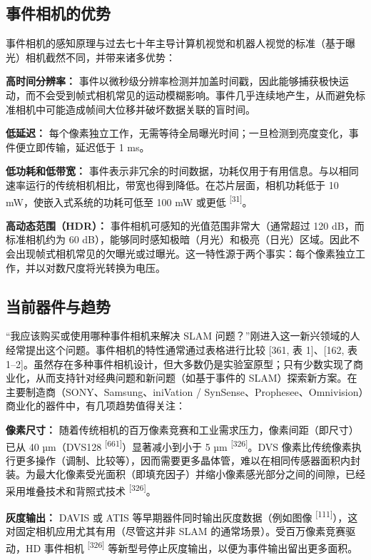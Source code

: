 \subsection{事件相机的优势}

事件相机的感知原理与过去七十年主导计算机视觉和机器人视觉的标准（基于曝光）相机截然不同，并带来诸多优势：

\textbf{高时间分辨率：} 事件以微秒级分辨率检测并加盖时间戳，因此能够捕获极快运动，而不会受到帧式相机常见的运动模糊影响。事件几乎连续地产生，从而避免标准相机中可能造成帧间大位移并破坏数据关联的盲时间。

\textbf{低延迟：} 每个像素独立工作，无需等待全局曝光时间；一旦检测到亮度变化，事件便立即传输，延迟低于 1 ms。

\textbf{低功耗和低带宽：} 事件表示非冗余的时间数据，功耗仅用于有用信息。与以相同速率运行的传统相机相比，带宽也得到降低。在芯片层面，相机功耗低于 10 mW，使嵌入式系统的功耗可低至 100 mW 或更低 \textsuperscript{[31]}。

\textbf{高动态范围（HDR）：} 事件相机可感知的光值范围非常大（通常超过 120 dB，而标准相机约为 60 dB），能够同时感知极暗（月光）和极亮（日光）区域。因此不会出现帧式相机常见的欠曝光或过曝光。这一特性源于两个事实：每个像素独立工作，并以对数尺度将光转换为电压。

\subsection{当前器件与趋势}

“我应该购买或使用哪种事件相机来解决 SLAM 问题？”刚进入这一新兴领域的人经常提出这个问题。事件相机的特性通常通过表格进行比较 [361, 表 1]、[162, 表 1–2]。虽然存在多种事件相机设计，但大多数仍是实验室原型；只有少数实现了商业化，从而支持针对经典问题和新问题（如基于事件的 SLAM）探索新方案。在主要制造商（SONY、Samsung、iniVation / SynSense、Prophesee、Omnivision）商业化的器件中，有几项趋势值得关注：

\textbf{像素尺寸：} 随着传统相机的百万像素竞赛和工业需求压力，像素间距（即尺寸）已从 40 µm（DVS128 \textsuperscript{[661]}）显著减小到小于 5 µm \textsuperscript{[326]}。DVS 像素比传统像素执行更多操作（调制、比较等），因而需要更多晶体管，难以在相同传感器面积内封装。为最大化像素受光面积（即填充因子）并缩小像素感光部分之间的间隙，已经采用堆叠技术和背照式技术 \textsuperscript{[326]}。

\textbf{灰度输出：} DAVIS 或 ATIS 等早期器件同时输出灰度数据（例如图像 \textsuperscript{[111]}），这对固定相机应用尤其有用（尽管这并非 SLAM 的通常场景）。受百万像素竞赛驱动，HD 事件相机 \textsuperscript{[326]} 等新型号停止灰度输出，以便为事件输出留出更多面积。

